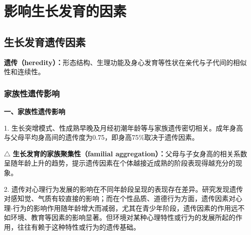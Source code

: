 \chapter{影响生长发育的因素}
\setcounter{chapter}{3}

\section{生长发育遗传因素}

\begin{defbox}
\textbf{遗传（heredity）：}形态结构、生理功能及身心发育等性状在亲代与子代间的相似性和连续性。
\end{defbox}

\subsection{家族性遗传影响}

\begin{keybox}
\textbf{一、家族性遗传影响}

1. 生长突增模式、性成熟早晚及月经初潮年龄等与家族遗传密切相关。成年身高与父母平均身高间的遗传度为0.75，即身高75\%取决于遗传因素。

$\triangle$ \textbf{生长发育的家族聚集性（familial aggregation）：}父母与子女身高的相关系数呈随年龄上升的趋势，提示遗传因素在个体越接近成熟的阶段表现得越充分的现象。

2. 遗传对心理行为发展的影响在不同年龄段呈现的表现存在差异。研究发现遗传对感知觉、气质有较直接的影响；而在个性品质、道德行为方面，遗传因素对心理-行为的影响作用随年龄增大而减弱，尤其在青少年阶段，遗传因素的作用远不如环境、教育等因素的影响显著。但环境对某种心理特性或行为的发展所起的作用，往往有赖于这种特性或行为的遗传基础。
\end{keybox}

